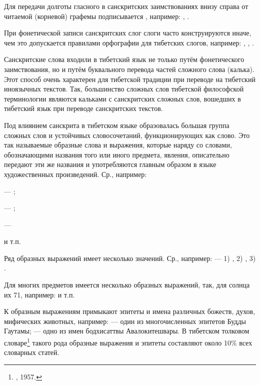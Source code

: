Для передачи долготы гласного в санскритских заимствованиях внизу справа от читаемой (корневой) графемы подписывается , например: , .

При фонетической записи санскритских слог слоги часто конструируются иначе, чем это допускается правилами орфографии для тибетских слогов, например: , , .

Санскритские слова входили в тибетский язык не только путём фонетического заимствования, но и путём буквального перевода частей сложного слова (калька). Этот способ очень характерен для тибетской традиции при переводе на тибетский иноязычных текстов. Так, большинство сложных слов тибетской философской терминологии являются кальками с санскритских сложных слов, вошедших в тибетский язык при переводе санскритских текстов.

Под влиянием санскрита в тибетском языке обраэовалась большая группа сложных слов и устойчивых словосочетаний, функционирующих как слово. Это так называемые образные слова и выражения, которые наряду со словами, обозначающими названия того или иного предмета, явления, описательно передают эти же названия и употребляются главным образом в языке художественных произведений.
Ср., например:
\begin{prfsample}
	\item {} --- ;
	\item {} --- ;
	\item {} --- 	
\end{prfsample}
 и т.п.

Ряд образных выражений имеет несколько значений. Ср., например:  --- 1) , 2) , 3) .

Для многих предметов имеется несколько образных выражений, так, для солнца их 71, например:  и т.п.

К образным выражениям примыкают эпитеты и имена различных божеств, духов, мифических животных, например:  --- один из многочисленных эпитетов Будды Гаутамы;  --- одно из имен бодхисаттвы Авалокитешвары. В тибетском толковом словаре\footnote[18]{, 1957.} такого рода образные выражения и эпитеты составляют около 10\% всех словарных статей.

